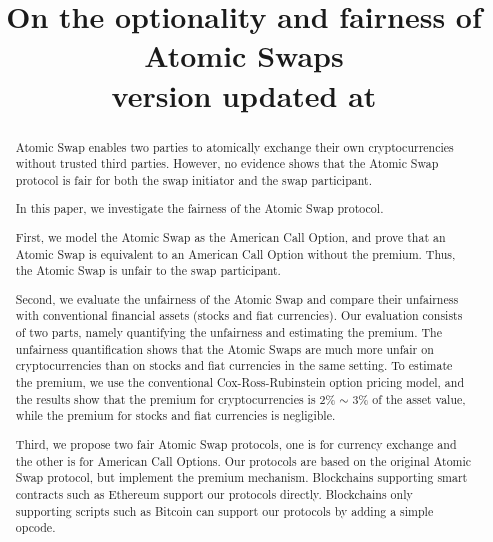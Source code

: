\documentclass[sigconf, natbib=false]{acmart}
\renewcommand\_{\textunderscore\allowbreak}
\begin{document}
\title{
    On the optionality and fairness of Atomic Swaps \\
    {\normalsize \normalfont version updated at \DTMnow }
}

\begin{abstract}
Atomic Swap enables two parties to atomically exchange their own cryptocurrencies without trusted third parties.
However, no evidence shows that the Atomic Swap protocol is fair for both the swap initiator and the swap participant.

In this paper, we investigate the fairness of the Atomic Swap protocol.

First, we model the Atomic Swap as the American Call Option,
and prove that an Atomic Swap is equivalent to an American Call Option without the premium.
Thus, the Atomic Swap is unfair to the swap participant.

Second, we evaluate the unfairness of the Atomic Swap and compare their unfairness with conventional financial assets (stocks and fiat currencies).
Our evaluation consists of two parts, namely quantifying the unfairness and estimating the premium.
The unfairness quantification shows that the Atomic Swaps are much more unfair on cryptocurrencies than on stocks and fiat currencies in the same setting.
To estimate the premium, we use the conventional Cox-Ross-Rubinstein option pricing model, and the results show that the premium for cryptocurrencies is 2\% $\sim$ 3\% of the asset value, while the premium for stocks and fiat currencies is negligible.

Third, we propose two fair Atomic Swap protocols,
one is for currency exchange and the other is for American Call Options.
Our protocols are based on the original Atomic Swap protocol, but implement the premium mechanism.
Blockchains supporting smart contracts such as Ethereum support our protocols directly.
Blockchains only supporting scripts such as Bitcoin can support our protocols by adding a simple opcode.
\end{abstract}
\end{document}
